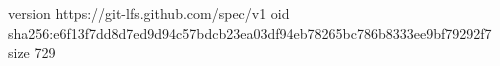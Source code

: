 version https://git-lfs.github.com/spec/v1
oid sha256:e6f13f7dd8d7ed9d94c57bdcb23ea03df94eb78265bc786b8333ee9bf79292f7
size 729
